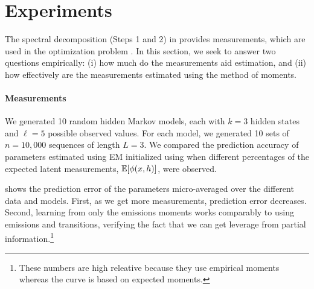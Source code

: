 \section{Experiments} \label{sec:experiments}

The spectral decomposition (Steps 1 and 2) in 
provides measurements,
which are used in the optimization problem .
In this section, we
seek to answer two questions empirically:
(i) how much do the measurements aid estimation, and
(ii) how effectively are the measurements estimated using the
method of moments.

\paragraph{Measurements}

We generated 10 random hidden Markov models,
each with $k=3$ hidden states and $\ell=5$ possible observed values. 
For each model, we generated 10 sets of $n=10,000$ sequences of length $L=3$.
We compared the prediction accuracy of parameters estimated using EM
initialized using  when different percentages of the expected
latent measurements, $\mathbb{E}[\phi(x,h)]$, were observed.



 shows the prediction error of the parameters
micro-averaged over the different data and models.  First, as we get more
measurements, prediction error decreases.  Second,
learning from only the emissions moments works comparably
to using emissions and transitions, verifying the fact that
we can get leverage from partial information.\footnote{
These numbers are high releative because they use empirical moments
whereas the curve is based on expected moments.}


